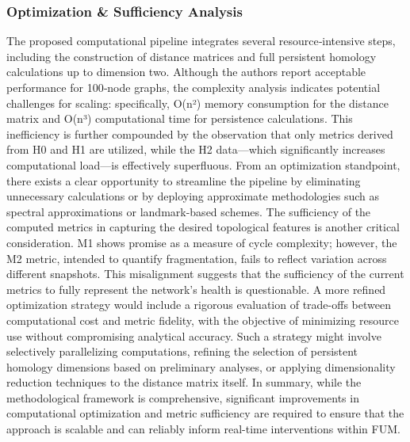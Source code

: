 \documentclass[12pt]{article}
\begin{document}
\subsubsection{Optimization \& Sufficiency Analysis  }
The proposed computational pipeline integrates several resource‐intensive steps, including the construction of distance matrices and full persistent homology calculations up to dimension two. Although the authors report acceptable performance for 100‐node graphs, the complexity analysis indicates potential challenges for scaling: specifically, O(n²) memory consumption for the distance matrix and O(n³) computational time for persistence calculations. This inefficiency is further compounded by the observation that only metrics derived from H0 and H1 are utilized, while the H2 data—which significantly increases computational load—is effectively superfluous. From an optimization standpoint, there exists a clear opportunity to streamline the pipeline by eliminating unnecessary calculations or by deploying approximate methodologies such as spectral approximations or landmark-based schemes. The sufficiency of the computed metrics in capturing the desired topological features is another critical consideration. M1 shows promise as a measure of cycle complexity; however, the M2 metric, intended to quantify fragmentation, fails to reflect variation across different snapshots. This misalignment suggests that the sufficiency of the current metrics to fully represent the network’s health is questionable. A more refined optimization strategy would include a rigorous evaluation of trade-offs between computational cost and metric fidelity, with the objective of minimizing resource use without compromising analytical accuracy. Such a strategy might involve selectively parallelizing computations, refining the selection of persistent homology dimensions based on preliminary analyses, or applying dimensionality reduction techniques to the distance matrix itself. In summary, while the methodological framework is comprehensive, significant improvements in computational optimization and metric sufficiency are required to ensure that the approach is scalable and can reliably inform real-time interventions within FUM.
\end{document}
